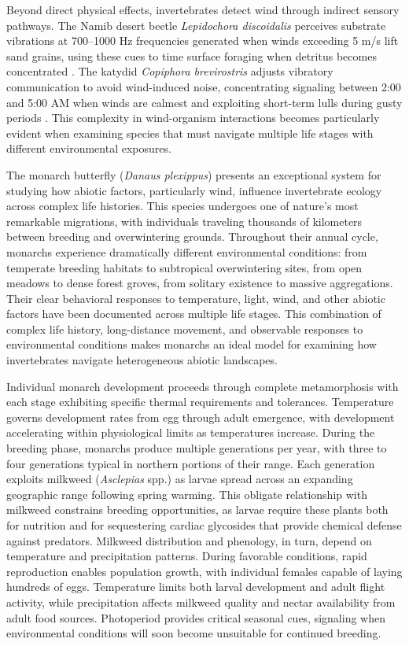 Beyond direct physical effects, invertebrates detect wind through indirect sensory pathways. The Namib desert beetle \textit{Lepidochora discoidalis} perceives substrate vibrations at 700--1000 Hz frequencies generated when winds exceeding 5 m/s lift sand grains, using these cues to time surface foraging when detritus becomes concentrated \citep{seelySandstormsTenebrionidBeetles1997}. The katydid \textit{Copiphora brevirostris} adjusts vibratory communication to avoid wind-induced noise, concentrating signaling between 2:00 and 5:00 AM when winds are calmest and exploiting short-term lulls during gusty periods \citep{rohmerGoneWindSignal2010}. This complexity in wind-organism interactions becomes particularly evident when examining species that must navigate multiple life stages with different environmental exposures.

The monarch butterfly (\textit{Danaus plexippus}) presents an exceptional system for studying how abiotic factors, particularly wind, influence invertebrate ecology across complex life histories. This species undergoes one of nature's most remarkable migrations, with individuals traveling thousands of kilometers between breeding and overwintering grounds. Throughout their annual cycle, monarchs experience dramatically different environmental conditions: from temperate breeding habitats to subtropical overwintering sites, from open meadows to dense forest groves, from solitary existence to massive aggregations. Their clear behavioral responses to temperature, light, wind, and other abiotic factors have been documented across multiple life stages. This combination of complex life history, long-distance movement, and observable responses to environmental conditions makes monarchs an ideal model for examining how invertebrates navigate heterogeneous abiotic landscapes.

Individual monarch development proceeds through complete metamorphosis with each stage exhibiting specific thermal requirements and tolerances. Temperature governs development rates from egg through adult emergence, with development accelerating within physiological limits as temperatures increase. During the breeding phase, monarchs produce multiple generations per year, with three to four generations typical in northern portions of their range. Each generation exploits milkweed (\textit{Asclepias} spp.) as larvae spread across an expanding geographic range following spring warming. This obligate relationship with milkweed constrains breeding opportunities, as larvae require these plants both for nutrition and for sequestering cardiac glycosides that provide chemical defense against predators. Milkweed distribution and phenology, in turn, depend on temperature and precipitation patterns. During favorable conditions, rapid reproduction enables population growth, with individual females capable of laying hundreds of eggs. Temperature limits both larval development and adult flight activity, while precipitation affects milkweed quality and nectar availability from adult food sources. Photoperiod provides critical seasonal cues, signaling when environmental conditions will soon become unsuitable for continued breeding.

